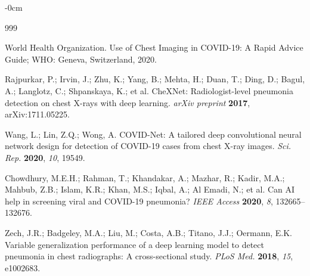 \documentclass[applsci,article,submit,pdftex,moreauthors]{Definitions/mdpi}
\begin{document}

\begin{adjustwidth}{-\extralength}{0cm}


\begin{thebibliography}{999}

World Health Organization. Use of Chest Imaging in COVID-19: A Rapid Advice Guide; WHO: Geneva, Switzerland, 2020.

Rajpurkar, P.; Irvin, J.; Zhu, K.; Yang, B.; Mehta, H.; Duan, T.; Ding, D.; Bagul, A.; Langlotz, C.; Shpanskaya, K.; et al. CheXNet: Radiologist-level pneumonia detection on chest X-rays with deep learning. \textit{arXiv preprint} \textbf{2017}, arXiv:1711.05225.

Wang, L.; Lin, Z.Q.; Wong, A. COVID-Net: A tailored deep convolutional neural network design for detection of COVID-19 cases from chest X-ray images. \textit{Sci. Rep.} \textbf{2020}, \textit{10}, 19549.

Chowdhury, M.E.H.; Rahman, T.; Khandakar, A.; Mazhar, R.; Kadir, M.A.; Mahbub, Z.B.; Islam, K.R.; Khan, M.S.; Iqbal, A.; Al Emadi, N.; et al. Can AI help in screening viral and COVID-19 pneumonia? \textit{IEEE Access} \textbf{2020}, \textit{8}, 132665--132676.

Zech, J.R.; Badgeley, M.A.; Liu, M.; Costa, A.B.; Titano, J.J.; Oermann, E.K. Variable generalization performance of a deep learning model to detect pneumonia in chest radiographs: A cross-sectional study. \textit{PLoS Med.} \textbf{2018}, \textit{15}, e1002683.


\end{thebibliography}
\end{adjustwidth}
\end{document}
